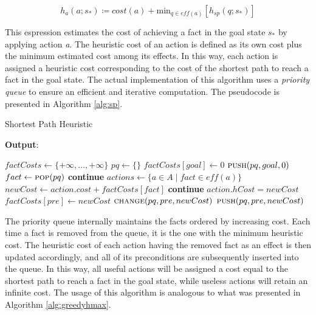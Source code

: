 \begin{equation}
	\label{eq:spcost}
	h_a\left(a;s_*\right) \coloneqq cost(a) + \text{min}_{q \in \textit{eff}\left(a\right)} \left[h_{sp}\left(q;s_*\right)\right]
\end{equation}

This espression estimates the cost of achieving a fact in the goal state $s_*$ by applying
action \textit{a}. The heuristic cost of an action is defined as its own cost plus the minimum estimated cost among its effects.
In this way, each action is assigned a heuristic cost corresponding to the cost of the shortest path to reach
a fact in the goal state.
The actual implementation of this algorithm uses a \textit{priority queue} to ensure an
efficient and iterative computation. The pseudocode is presented in Algorithm \ref{alg:sp}.

\begin{algorithm}
	\caption{Shortest Path Heuristic}
	\label{alg:sp}
	\hspace*{0.5em} \textbf{Output}:
	\begin{algorithmic}[1]
		\State $factCosts \gets \{+\infty, \dots, +\infty\}$ 
		\State $pq\gets \{\}$ 
		\State $factCosts[goal] \gets 0$
		\State $\Call{push}{pq, goal, 0}$
		\EndFor
		\State $fact \gets \Call{pop}{pq}$ 
		\State \textbf{continue} 
		\EndIf
		\State $actions \gets \{a \in A \mid fact \in \textit{eff}\left(a\right)\}$
		\State $newCost \gets action.cost + factCosts[fact]$
		\State \textbf{continue}
		\EndIf
		\State $action.hCost = newCost$
		\State $factCosts[pre] \gets newCost$
		\State $\Call{change}{pq, pre, newCost}$
		\Else
		\State $\Call{push}{pq, pre, newCost}$
		\EndIf
		\EndIf
		\EndFor
		\EndFor
		\EndWhile
		\EndProcedure
	\end{algorithmic}
\end{algorithm}

The priority queue internally maintains the facts ordered by increasing cost.
Each time a fact is removed from the queue, it is the one with the minimum heuristic cost.
The heuristic cost of each action having the removed fact as an effect is then updated accordingly,
and all of its preconditions are subsequently inserted into the queue.
In this way, all useful actions will be assigned a cost equal to the shortest path to reach a fact in
the goal state, while useless actions will retain an infinite cost.
The usage of this algorithm is analogous to what was presented in Algorithm \ref{alg:greedyhmax}.
